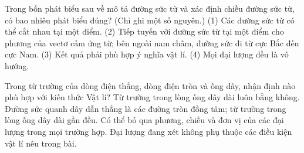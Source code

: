 \begin{ex}
Trong bốn phát biểu sau về mô tả đường sức từ và xác định chiều đường sức từ, có bao nhiêu phát biểu đúng? (Chỉ ghi một số nguyên.) (1) Các đường sức từ có thể cắt nhau tại một điểm. (2) Tiếp tuyến với đường sức từ tại một điểm cho phương của vectơ cảm ứng từ; bên ngoài nam châm, đường sức đi từ cực Bắc đến cực Nam. (3) Kết quả phải phù hợp ý nghĩa vật lí. (4) Mọi đại lượng đều là vô hướng.
\end{ex}

\begin{ex}
Trong từ trường của dòng điện thẳng, dòng điện tròn và ống dây, nhận định nào phù hợp với kiến thức Vật lí?
\choice
{Từ trường trong lòng ống dây dài luôn bằng không.}
{\True Đường sức quanh dây dẫn thẳng là các đường tròn đồng tâm; từ trường trong lòng ống dây dài gần đều.}
{Có thể bỏ qua phương, chiều và đơn vị của các đại lượng trong mọi trường hợp.}
{Đại lượng đang xét không phụ thuộc các điều kiện vật lí nêu trong bài.}
\end{ex}

